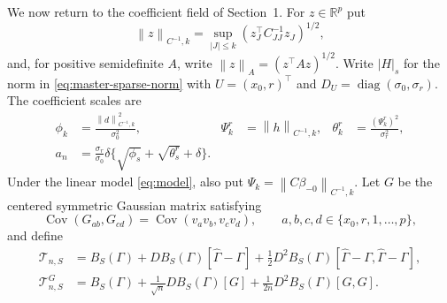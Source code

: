 \documentclass[a4paper,11pt,english]{article}
\newcommand{\Cov}{\operatorname{Cov}}
\newcommand{\norm}[1]{\left\lVert #1\right\rVert}
\newcommand{\R}{\mathbb R}
\begin{document}
We now return to the coefficient field of Section~1.  For $z\in\R^p$ put
\[
 \norm{z}_{C^{-1},k}=\sup_{|J|\le k}
 (z_J^\top C_{JJ}^{-1}z_J)^{1/2},
\]
and, for positive semidefinite $A$, write
$\norm{z}_A=(z^\top Az)^{1/2}$.
Write $|H|_s$ for the norm in
\eqref{eq:master-sparse-norm} with
$U=(x_0,r)^\top$ and
$D_U=\operatorname{diag}(\sigma_0,\sigma_r)$.
The coefficient scales are
\begin{equation}\label{eq:coefficient-master-scales}
\begin{aligned}
 \phi_k&=\frac{\norm{d}_{C^{-1},k}^2}{\sigma_0^2},
 &\Psi_k^r&=\norm{h}_{C^{-1},k},
 &\theta_k^r&=\frac{(\Psi_k^r)^2}{\sigma_r^2},\\
 a_n&=\frac{\sigma_r}{\sigma_0}\delta
 \{\sqrt{\phi_s}+\sqrt{\theta_s^r}+\delta\}.
\end{aligned}
\end{equation}
Under the linear model \eqref{eq:model}, also put
$\Psi_k=\norm{C\beta_{-0}}_{C^{-1},k}$.
Let $G$ be the centered symmetric Gaussian matrix satisfying
\begin{equation}\label{eq:coefficient-matched-covariance}
 \Cov(G_{ab},G_{cd})
 =\Cov(v_av_b,v_cv_d),
 \qquad a,b,c,d\in\{x_0,r,1,\ldots,p\},
\end{equation}
and define
\begin{align}
 \mathcal T_{n,S}
 &=B_S(\Gamma)+DB_S(\Gamma)[\hat\Gamma-\Gamma]
 +\frac12D^2B_S(\Gamma)
 [\hat\Gamma-\Gamma,\hat\Gamma-\Gamma],
 \label{eq:coefficient-empirical-taylor}\\
 \mathcal T^G_{n,S}
 &=B_S(\Gamma)+\frac1{\sqrt n}DB_S(\Gamma)[G]
 +\frac1{2n}D^2B_S(\Gamma)[G,G].
 \label{eq:coefficient-gaussian-taylor}
\end{align}
\end{document}
